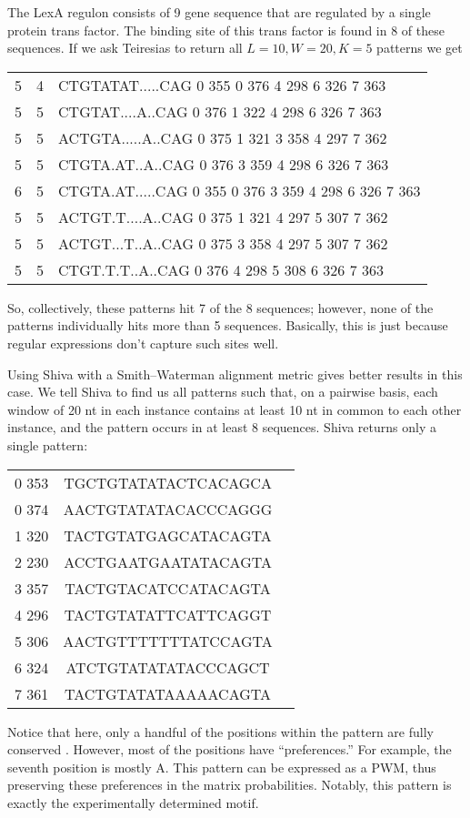 The LexA regulon consists of 9 gene sequence that are regulated by a single 
protein trans factor.  The binding site of this trans factor is found in 8 
of these sequences.  If we ask Teiresias to return all $L=10, W=20, K=5$ patterns
we get\\	
    {
	\begin{center}
	\ttfamily
	\begin{tabular}{ccl}
	    5 & 4 & CTGTATAT.....CAG 0 355 0 376 4 298 6 326 7 363 \\
	    5 & 5 & CTGTAT....A..CAG 0 376 1 322 4 298 6 326 7 363 \\
	    5 & 5 & ACTGTA.....A..CAG 0 375 1 321 3 358 4 297 7 362 \\
	    5 & 5 & CTGTA.AT..A..CAG 0 376 3 359 4 298 6 326 7 363\\ 
	    6 & 5 & CTGTA.AT.....CAG 0 355 0 376 3 359 4 298 6 326 7 363\\
	    5 & 5 & ACTGT.T....A..CAG 0 375 1 321 4 297 5 307 7 362\\
	    5 & 5 & ACTGT...T..A..CAG 0 375 3 358 4 297 5 307 7 362\\
	    5 & 5 & CTGT.T.T..A..CAG 0 376 4 298 5 308 6 326 7 363
	\end{tabular}
	\end{center}
    }
So, collectively, these patterns hit 7 of the 8 sequences; however, none of 
the patterns individually hits more than 5 sequences.  Basically, this is
just because regular expressions don't capture such sites well.

Using Shiva with a Smith--Waterman alignment metric gives better results in this
case.  We tell Shiva to find us all patterns such that, on a pairwise basis,
each window of 20 nt in each instance contains at least 10 nt in common to each
other instance, and the pattern occurs in at least 8 sequences.  Shiva returns
only a single pattern: \\
    {
	\begin{center}
	\ttfamily
	\begin{tabular}{ccl}
	   0  353 &TGCTGTATATACTCACAGCA \\
	   0  374 &AACTGTATATACACCCAGGG \\
	   1  320 &TACTGTATGAGCATACAGTA \\
	   2  230 &ACCTGAATGAATATACAGTA \\
	   3  357 &TACTGTACATCCATACAGTA \\
	   4  296 &TACTGTATATTCATTCAGGT \\
	   5  306 &AACTGTTTTTTTATCCAGTA \\
	   6  324 &ATCTGTATATATACCCAGCT \\
	   7  361 &TACTGTATATAAAAACAGTA \\
	\end{tabular}
	\end{center}
    }
Notice that here, only a handful of the positions within the pattern are
fully conserved .  However, most of the positions have ``preferences.''
For example, the seventh position is mostly A\@.  This pattern can be expressed
as a PWM, thus preserving these preferences in the matrix probabilities.
Notably, this pattern is exactly the experimentally determined motif.


